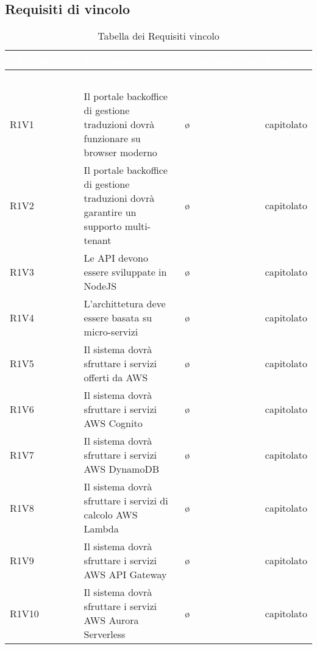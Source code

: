{\begin{longtable}{ l p{7cm} l p{3cm}}
        \end{longtable}
        
    }


\subsection{Requisiti di vincolo}
        \renewcommand{\arraystretch}{1.5}
        
        \begin{longtable}{ l p{7cm} l p{3cm}}
            \caption{Tabella dei Requisiti vincolo}\\
            \rowcolor{darkblue}
            \textcolor{white}{Identificativo} & \textcolor{white}{Descrizione} & \textcolor{white}{Classificazione} & \textcolor{white}{Fonti}\\	
            \endfirsthead
            \rowcolor{darkblue}
            \textcolor{white}{Identificativo} & \textcolor{white}{Descrizione} & \textcolor{white}{Classificazione} & \textcolor{white}{Fonti}\\
            \endhead
            R1V1 & Il portale backoffice di gestione traduzioni dovrà funzionare su browser moderno & \o & capitolato\\
            R1V2 & Il portale backoffice di gestione traduzioni dovrà garantire un supporto multi-tenant & \o & capitolato\\
            R1V3 & Le API devono essere sviluppate in NodeJS & \o & capitolato\\
            R1V4 & L'archittetura deve essere basata su micro-servizi & \o & capitolato\\
            R1V5 & Il sistema dovrà sfruttare i servizi offerti da AWS & \o & capitolato\\
            R1V6 & Il sistema dovrà sfruttare i servizi AWS Cognito & \o & capitolato\\
            R1V7 & Il sistema dovrà sfruttare i servizi AWS DynamoDB & \o & capitolato\\
            R1V8 & Il sistema dovrà sfruttare i servizi di calcolo AWS Lambda & \o & capitolato\\
            R1V9 & Il sistema dovrà sfruttare i servizi AWS API Gateway & \o & capitolato\\
            R1V10 & Il sistema dovrà sfruttare i servizi AWS Aurora Serverless & \o & capitolato\\
        \end{longtable}
